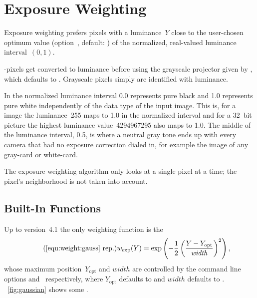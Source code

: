 

\section[Exposure Weighting]{\label{sec:exposure-weighting}%
  Exposure Weighting}

%
Exposure weighting prefers pixels with a luminance~$Y$ close to the user-chosen optimum value
(option~, default: ) of the
normalized, real-valued luminance interval~$(0, 1)$.

%
%
%
-pixels get converted to luminance before using the grayscale projector given by
, which defaults to .  Grayscale pixels simply are
identified with luminance.

%
%
In the normalized luminance interval 0.0 represents pure black and 1.0 represents pure white
independently of the data type of the input image.  This is, for a  image the
luminance~255 maps to 1.0 in the normalized interval and for a 32~bit  picture the
highest luminance value~4294967295 also maps to 1.0.  The middle of the luminance interval, 0.5,
is where a neutral gray tone ends up with every camera that had no exposure correction dialed
in, for example the image of any gray-card or white-card.

The exposure weighting algorithm only looks at a single pixel at a time; the pixel's
neighborhood is not taken into account.


\subsection[Built-In Functions]{\label{sec:built-in-functions}%
  Built-In Functions}

%
%
Up to \App{} version~4.1 the only weighting function is the 
\begin{equation*}\refrep{equ:weight:gauss}%
    w_{\mathrm{exp}}(Y) =
    \exp\left(-\frac{1}{2}
              \left( \frac{Y - Y_{\mathrm{opt}}}{\mathit{width}} \right)^2\right),
\end{equation*}
\noindent whose maximum position~$Y_{\mathrm{opt}}$ and $width$ are controlled by the command
line options  and~ respectively, where
$Y_{\mathrm{opt}}$ defaults to  and $width$ defaults to
.  \figureName~\ref{fig:gaussian} shows some
.


